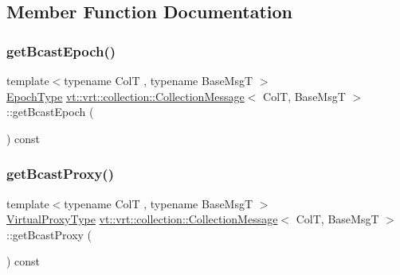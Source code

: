\subsection{Member Function Documentation}
\mbox{\label{structvt_1_1vrt_1_1collection_1_1_collection_message_a81604b8f38e3ee3eea6caf6a1012175c}} 
\subsubsection{\texorpdfstring{get\+Bcast\+Epoch()}{getBcastEpoch()}}
{\footnotesize\ttfamily template$<$typename ColT , typename Base\+MsgT $>$ \\
\hyperlink{namespacevt_a985a5adf291c34a3ca263b3378388236}{Epoch\+Type} \hyperlink{structvt_1_1vrt_1_1collection_1_1_collection_message}{vt\+::vrt\+::collection\+::\+Collection\+Message}$<$ ColT, Base\+MsgT $>$\+::get\+Bcast\+Epoch (\begin{DoxyParamCaption}{ }\end{DoxyParamCaption}) const}

\mbox{\label{structvt_1_1vrt_1_1collection_1_1_collection_message_a25c1d0924ade6a7e074fc419a75c8a71}} 
\subsubsection{\texorpdfstring{get\+Bcast\+Proxy()}{getBcastProxy()}}
{\footnotesize\ttfamily template$<$typename ColT , typename Base\+MsgT $>$ \\
\hyperlink{namespacevt_a1b417dd5d684f045bb58a0ede70045ac}{Virtual\+Proxy\+Type} \hyperlink{structvt_1_1vrt_1_1collection_1_1_collection_message}{vt\+::vrt\+::collection\+::\+Collection\+Message}$<$ ColT, Base\+MsgT $>$\+::get\+Bcast\+Proxy (\begin{DoxyParamCaption}{ }\end{DoxyParamCaption}) const}

